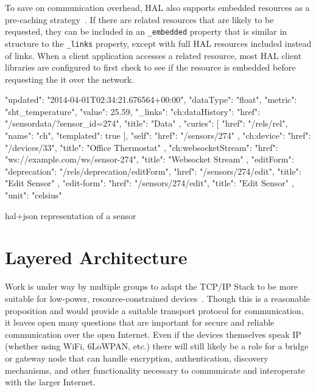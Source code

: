 \documentclass{acm_proc_article-sp}
\begin{document}
To save on communication overhead, HAL also supports embedded resources as a
pre-caching strategy~\cite{json-hal-draft}. If there are related resources that
are likely to be requested, they can be included in an \texttt{\_embedded}
property that is similar in structure to the \texttt{\_links} property, except
with full HAL resources included instead of links. When a client application
accesses a related resource, most HAL client libraries are configured to first
check to see if the resource is embedded before requesting the it over the
network.

\begin{listing}
\begin{jsoncode}
  {
    "updated": "2014-04-01T02:34:21.676564+00:00",
    "dataType": "float",
    "metric": "sht_temperature",
    "value": 25.59,
    "_links": {
      "ch:dataHistory": {
        "href": "/sensordata/?sensor_id=274",
        "title": "Data"
      },
      "curies": [
        {
          "href": "/rels/{rel}",
          "name": "ch",
          "templated": true
        }
      ],
      "self": {
        "href": "/sensors/274"
      },
      "ch:device": {
        "href": "/devices/33",
        "title": "Office Thermostat"
      },
      "ch:websocketStream": {
        "href": "ws://example.com/ws/sensor-274",
        "title": "Websocket Stream"
      },
      "editForm": {
        "deprecation": "/rels/deprecation/editForm",
        "href": "/sensors/274/edit",
        "title": "Edit Sensor"
      },
      "edit-form": {
        "href": "/sensors/274/edit",
        "title": "Edit Sensor"
      }
    },
    "unit": "celsius"
  }
\end{jsoncode}
\caption{hal+json representation of a sensor}
\label{sensorjson}
\end{listing}


\section{Layered Architecture}

Work is under way by multiple groups to adapt the TCP/IP Stack to be more
suitable for low-power, resource-constrained devices~\cite{iotsurvey}. Though
this is a reasonable proposition and would provide a suitable transport
protocol for communication, it leaves open many questions that are important
for secure and reliable communication over the open Internet. Even if the
devices themselves speak IP (whether using WiFi, 6LoWPAN, etc.) there will
still likely be a role for a bridge or gateway node that can handle encryption,
authentication, discovery mechanisms, and other functionality necessary to
communicate and interoperate with the larger Internet.
\end{document}
